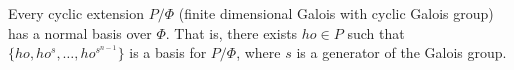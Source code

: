 Every cyclic extension $P/\Phi$ (finite dimensional Galois with cyclic Galois group) has a normal basis over $\Phi$. That is, there exists $
ho \in P$ such that $\{
ho, 
ho^s, \ldots, 
ho^{s^{n-1}}\}$ is a basis for $P/\Phi$, where $s$ is a generator of the Galois group.
